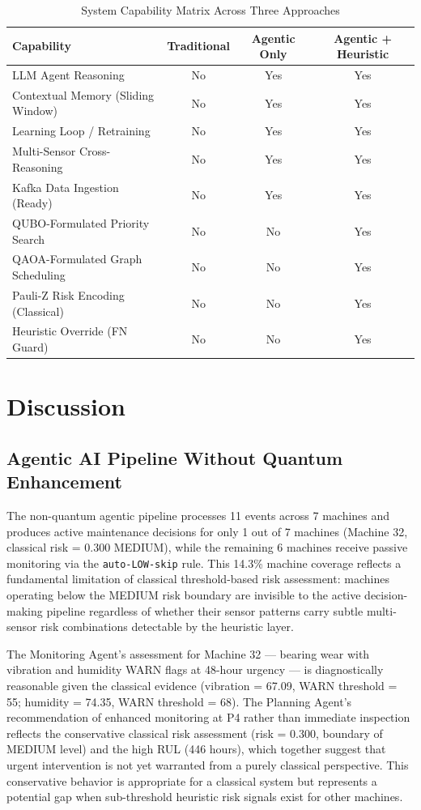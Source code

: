 \begin{table}[htbp]
\centering
\caption{System Capability Matrix Across Three Approaches}
\label{tab:capability_matrix}
\begin{tabular}{lccc}
\hline
\textbf{Capability} & \textbf{Traditional} & \textbf{Agentic Only} & \textbf{Agentic + Heuristic} \\
\hline
LLM Agent Reasoning               & No  & Yes & Yes \\
Contextual Memory (Sliding Window)& No  & Yes & Yes \\
Learning Loop / Retraining        & No  & Yes & Yes \\
Multi-Sensor Cross-Reasoning      & No  & Yes & Yes \\
Kafka Data Ingestion (Ready)      & No  & Yes & Yes \\
QUBO-Formulated Priority Search   & No  & No  & Yes \\
QAOA-Formulated Graph Scheduling  & No  & No  & Yes \\
Pauli-Z Risk Encoding (Classical) & No  & No  & Yes \\
Heuristic Override (FN Guard)     & No  & No  & Yes \\
\hline
\end{tabular}
\end{table}

\section{Discussion}

\subsection{Agentic AI Pipeline Without Quantum Enhancement}

The non-quantum agentic pipeline processes 11 events across 7 machines and produces active maintenance decisions for only 1 out of 7 machines (Machine 32, classical risk = 0.300 MEDIUM), while the remaining 6 machines receive passive monitoring via the \texttt{auto-LOW-skip} rule. This 14.3\% machine coverage reflects a fundamental limitation of classical threshold-based risk assessment: machines operating below the MEDIUM risk boundary are invisible to the active decision-making pipeline regardless of whether their sensor patterns carry subtle multi-sensor risk combinations detectable by the heuristic layer.

The Monitoring Agent's assessment for Machine 32 --- bearing wear with vibration and humidity WARN flags at 48-hour urgency --- is diagnostically reasonable given the classical evidence (vibration = 67.09, WARN threshold = 55; humidity = 74.35, WARN threshold = 68). The Planning Agent's recommendation of enhanced monitoring at P4 rather than immediate inspection reflects the conservative classical risk assessment (risk = 0.300, boundary of MEDIUM level) and the high RUL (446 hours), which together suggest that urgent intervention is not yet warranted from a purely classical perspective. This conservative behavior is appropriate for a classical system but represents a potential gap when sub-threshold heuristic risk signals exist for other machines.

